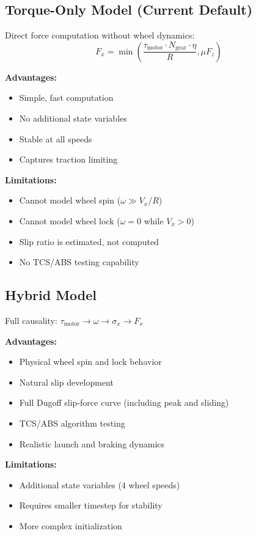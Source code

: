 \documentclass[11pt,a4paper]{article}
\begin{document}
\subsection{Torque-Only Model (Current Default)}

Direct force computation without wheel dynamics:
\begin{equation}
F_x = \min\left( \frac{\tau_{\text{motor}} \cdot N_{\text{gear}} \cdot \eta}{R}, \mu F_z \right)
\end{equation}

\textbf{Advantages:}
\begin{itemize}
    \item Simple, fast computation
    \item No additional state variables
    \item Stable at all speeds
    \item Captures traction limiting
\end{itemize}

\textbf{Limitations:}
\begin{itemize}
    \item Cannot model wheel spin ($\omega \gg V_x/R$)
    \item Cannot model wheel lock ($\omega = 0$ while $V_x > 0$)
    \item Slip ratio is estimated, not computed
    \item No TCS/ABS testing capability
\end{itemize}

\subsection{Hybrid Model}

Full causality: $\tau_{\text{motor}} \rightarrow \omega \rightarrow \sigma_x \rightarrow F_x$

\textbf{Advantages:}
\begin{itemize}
    \item Physical wheel spin and lock behavior
    \item Natural slip development
    \item Full Dugoff slip-force curve (including peak and sliding)
    \item TCS/ABS algorithm testing
    \item Realistic launch and braking dynamics
\end{itemize}

\textbf{Limitations:}
\begin{itemize}
    \item Additional state variables (4 wheel speeds)
    \item Requires smaller timestep for stability
    \item More complex initialization
\end{itemize}
\end{document}

